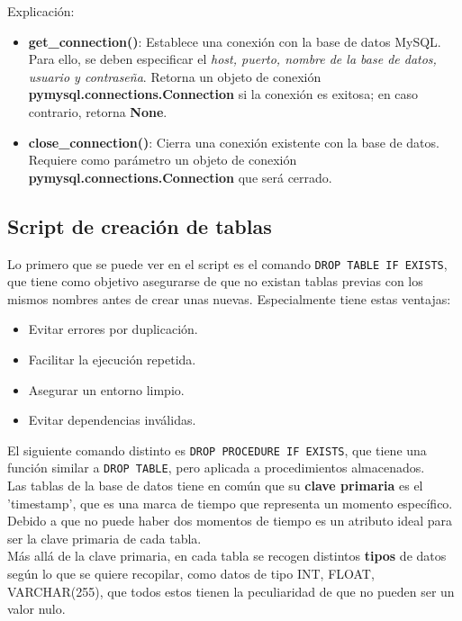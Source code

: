 \documentclass{article}
\begin{document}
\vspace{0.4cm}
Explicación:

\begin{itemize}
    \item \textbf{get\_connection()}: Establece una conexión con la base de datos MySQL. Para ello, se deben especificar el \textit{host, puerto, nombre de la base de datos, usuario y contraseña}. Retorna un objeto de conexión \textbf{pymysql.connections.Connection} si la conexión es exitosa; en caso contrario, retorna \textbf{None}.
    \item \textbf{close\_connection()}: Cierra una conexión existente con la base de datos. Requiere como parámetro un objeto de conexión \textbf{pymysql.connections.Connection} que será cerrado.
\end{itemize}

\subsection{Script de creación de tablas}

Lo primero que se puede ver en el script es el comando \lstinline{DROP TABLE IF EXISTS}, que tiene como objetivo asegurarse de que no existan tablas previas con los mismos nombres antes de crear unas nuevas. Especialmente tiene estas ventajas:

\begin{itemize}
    \item Evitar errores por duplicación.
    \item Facilitar la ejecución repetida.
    \item Asegurar un entorno limpio.
    \item Evitar dependencias inválidas.
\end{itemize}

El siguiente comando distinto es \lstinline{DROP PROCEDURE IF EXISTS}, que tiene una función similar a \lstinline{DROP TABLE}, pero aplicada a procedimientos almacenados.\\

Las tablas de la base de datos tiene en común que su \textbf{clave primaria} es el 'timestamp', que es una marca de tiempo que representa un momento específico. Debido a que no puede haber dos momentos de tiempo es un atributo ideal para ser la clave primaria de cada tabla.\\

Más allá de la clave primaria, en cada tabla se recogen distintos \textbf{tipos} de datos según lo que se quiere recopilar, como datos de tipo INT, FLOAT, VARCHAR(255), que todos estos tienen la peculiaridad de que no pueden ser un valor nulo.\\
\end{document}
